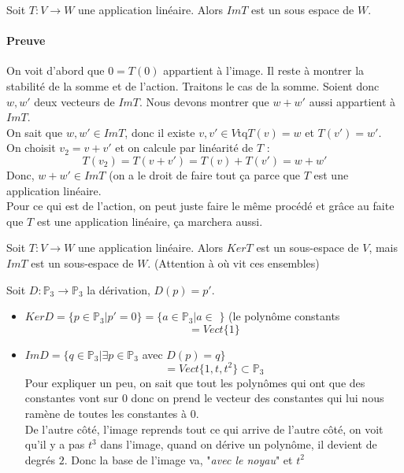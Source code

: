 \begin{theoreme}
    Soit $T : V \to W$ une application linéaire. Alors $Im T$ est un sous espace de $W$.
\end{theoreme}
\paragraph{Preuve}
On voit d'abord que $0 = T(0)$ appartient à l'image. Il reste à montrer la stabilité de la somme et de l'action. Traitons le cas de la somme. Soient donc $w, w'$ deux vecteurs de $Im T$. Nous devons montrer que $w + w'$ aussi appartient à $Im T$.
\\
On sait que $w, w' \in ImT$, donc il existe $v, v' \in V \text{tq} T(v) = w $ et $T(v') = w'$.\\
On choisit $v_2 = v + v'$ et on calcule par linéarité de $T$ : \[T(v_2) = T(v + v') = T(v) + T(v') = w + w'\]
Donc, $w + w' \in Im T$  (on a le droit de faire tout ça parce que $T$ est une application linéaire.
\\
Pour ce qui est de l'action, on peut juste faire le même procédé et grâce au faite que $T$ est une application linéaire, ça marchera aussi.


\begin{framedremark}
    Soit $T : V \to W$ une application linéaire. Alors $Ker T$ est un sous-espace de $V$, mais $Im T$ est un sous-espace de $W$. (Attention à où vit ces ensembles)
\end{framedremark}

\begin{exemple}
    Soit $D : \mathbb{P}_3 \to \mathbb{P}_3$ la dérivation, $D(p) = p'$.
    \begin{itemize}
        \item $Ker D = \{p \in \mathbb{P}_3 | p' = 0\} = \{a \in \mathbb{P}_3 | a \in $ \R $\}$ (le polynôme constants \[= Vect\{1\}\]

        \item $Im D = \{q \in \mathbb{P}_3 | \exists p \in \mathbb{P}_3$ avec $D(p)  = q\}$
\[= Vect\{1, t, t^2\} \subset \mathbb{P}_3\]
Pour expliquer un peu, on sait que tout les polynômes qui ont que des constantes vont sur $0$ donc on prend le vecteur des constantes qui lui nous ramène de toutes les constantes à $0$.\\
De l'autre côté, l'image reprends tout ce qui arrive de l'autre côté, on voit qu'il y a pas $t^3$ dans l'image, quand on dérive un polynôme, il devient de degrés $2$. Donc la base de l'image va, "\textit{avec le noyau}" et $t^2$

    \end{itemize}
\end{exemple}

